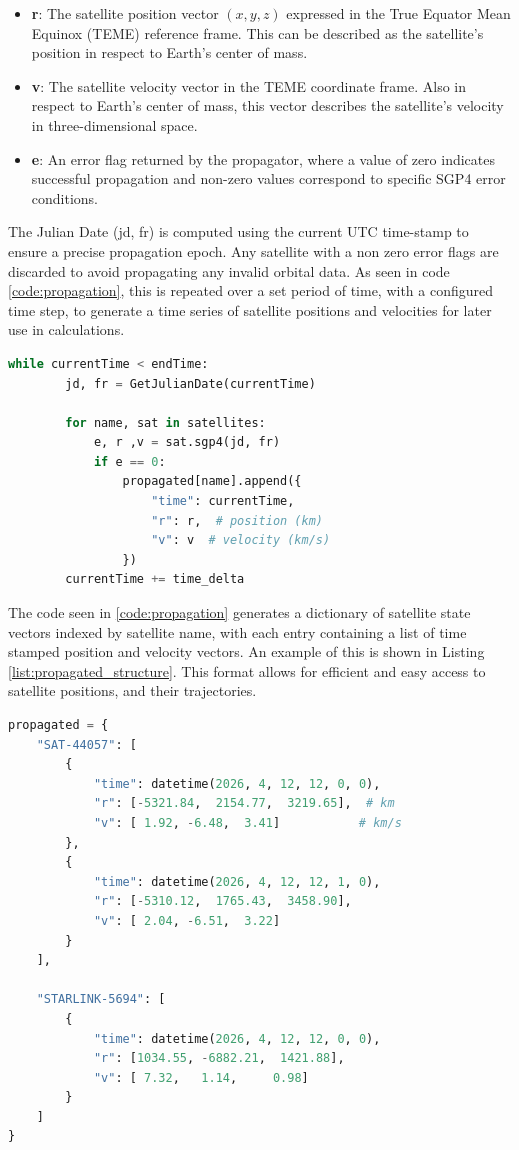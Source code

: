 \begin{itemize}
    \item \textbf{r}: The satellite position vector $\left(x, y, z\right)$ expressed in the True Equator Mean Equinox (TEME) reference frame. This can be described as the satellite's position in respect to Earth's center of mass.
    \item \textbf{v}: The satellite velocity vector in the TEME coordinate frame. Also in respect to Earth's center of mass, this vector describes the satellite's velocity in three-dimensional space.
    \item \textbf{e}: An error flag returned by the propagator, where a value of zero indicates successful propagation and non-zero values correspond to specific SGP4 error conditions.
\end{itemize}

The Julian Date (jd, fr) is computed using the current UTC time-stamp to ensure a precise propagation epoch. Any satellite with a non zero error flags are discarded to avoid propagating any invalid orbital data. As seen in code \ref{code:propagation}, this is repeated over a set period of time, with a configured time step, to generate a time series of satellite positions and velocities for later use in calculations.

\begin{lstlisting}[language=Python, caption={SGP4 propagation}, label={code:propagation}]
        while currentTime < endTime:
        jd, fr = GetJulianDate(currentTime)

        for name, sat in satellites:
            e, r ,v = sat.sgp4(jd, fr)
            if e == 0:
                propagated[name].append({
                    "time": currentTime,
                    "r": r,  # position (km)
                    "v": v  # velocity (km/s)
                })
        currentTime += time_delta
\end{lstlisting}

The code seen in \ref{code:propagation} generates a dictionary of satellite state vectors indexed by satellite name, with each entry containing a list of time stamped position and velocity vectors. An example of this is shown in Listing \ref{list:propagated_structure}. This format allows for efficient and easy access to satellite positions, and their trajectories.

\begin{lstlisting}[language=Python, caption={Structure of propagated satellite state vectors stored in a dictionary}, label={list:propagated_structure}]
propagated = {
    "SAT-44057": [
        {
            "time": datetime(2026, 4, 12, 12, 0, 0),
            "r": [-5321.84,  2154.77,  3219.65],  # km
            "v": [ 1.92, -6.48,  3.41]           # km/s
        },
        {
            "time": datetime(2026, 4, 12, 12, 1, 0),
            "r": [-5310.12,  1765.43,  3458.90],
            "v": [ 2.04, -6.51,  3.22]
        }
    ],

    "STARLINK-5694": [
        {
            "time": datetime(2026, 4, 12, 12, 0, 0),
            "r": [1034.55, -6882.21,  1421.88],
            "v": [ 7.32,   1.14,     0.98]
        }
    ]
}
\end{lstlisting}


